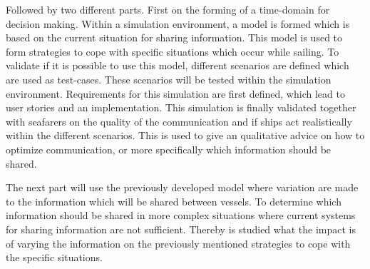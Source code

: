 Followed by two different parts. First on the forming of a time-domain for decision making. Within a simulation environment, a model is formed which is based on the current situation for sharing information. This model is used to form strategies to cope with specific situations which occur while sailing. To validate if it is possible to use this model, different scenarios are defined which are used as test-cases. These scenarios will be tested within the simulation environment. Requirements for this simulation are first defined, which lead to user stories and an implementation.
This simulation is finally validated together with seafarers on the quality of the communication and if ships act realistically within the different scenarios. This is used to give an qualitative advice on how to optimize communication, or more specifically which information should be shared.

The next part will use the previously developed model where variation are made to the information which will be shared between vessels. To determine which information should be shared in more complex situations where current systems for sharing information are not sufficient. Thereby is studied what the impact is of varying the information on the previously mentioned strategies to cope with the specific situations.
